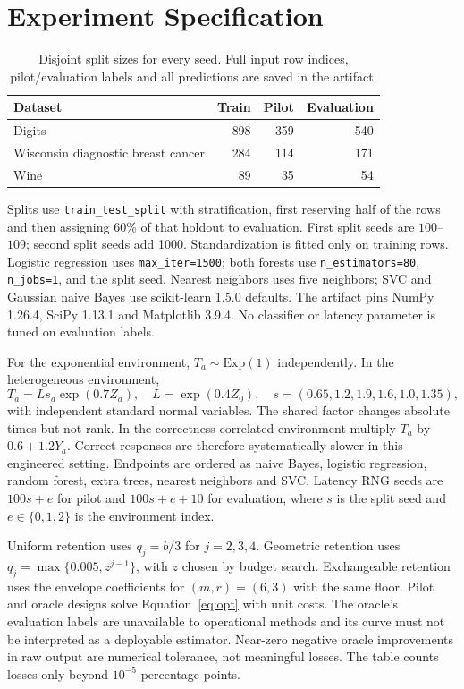 \documentclass[12pt]{clear2027}
\begin{document}
\section{Experiment Specification}\label{app:exp}
\begin{table}[h]
\centering\small
\begin{tabular}{lrrr}\toprule
Dataset & Train & Pilot & Evaluation\\\midrule
Digits & 898 & 359 & 540\\
Wisconsin diagnostic breast cancer & 284 & 114 & 171\\
Wine & 89 & 35 & 54\\\bottomrule
\end{tabular}
\caption{Disjoint split sizes for every seed. Full input row indices, pilot/evaluation labels and all predictions are saved in the artifact.}
\end{table}
Splits use \texttt{train\_test\_split} with stratification, first reserving half of the rows and then assigning 60\% of that holdout to evaluation. First split seeds are $100$--$109$; second split seeds add 1000. Standardization is fitted only on training rows. Logistic regression uses \texttt{max\_iter=1500}; both forests use \texttt{n\_estimators=80}, \texttt{n\_jobs=1}, and the split seed. Nearest neighbors uses five neighbors; SVC and Gaussian naive Bayes use scikit-learn 1.5.0 defaults. The artifact pins NumPy 1.26.4, SciPy 1.13.1 and Matplotlib 3.9.4. No classifier or latency parameter is tuned on evaluation labels.

For the exponential environment, $T_a\sim\mathrm{Exp}(1)$ independently. In the heterogeneous environment,
\[
 T_a=L s_a\exp(0.7 Z_a),\quad
 L=\exp(0.4 Z_0),\quad
 s=(0.65,1.2,1.9,1.6,1.0,1.35),
\]
with independent standard normal variables. The shared factor changes absolute times but not rank. In the correctness-correlated environment multiply $T_a$ by $0.6+1.2Y_a$. Correct responses are therefore systematically slower in this engineered setting. Endpoints are ordered as naive Bayes, logistic regression, random forest, extra trees, nearest neighbors and SVC. Latency RNG seeds are $100s+e$ for pilot and $100s+e+10$ for evaluation, where $s$ is the split seed and $e\in\{0,1,2\}$ is the environment index.

Uniform retention uses $q_j=b/3$ for $j=2,3,4$. Geometric retention uses $q_j=\max\{0.005,z^{j-1}\}$, with $z$ chosen by budget search. Exchangeable retention uses the envelope coefficients for $(m,r)=(6,3)$ with the same floor. Pilot and oracle designs solve Equation~\eqref{eq:opt} with unit costs. The oracle's evaluation labels are unavailable to operational methods and its curve must not be interpreted as a deployable estimator. Near-zero negative oracle improvements in raw output are numerical tolerance, not meaningful losses. The table counts losses only beyond $10^{-5}$ percentage points.
\end{document}
